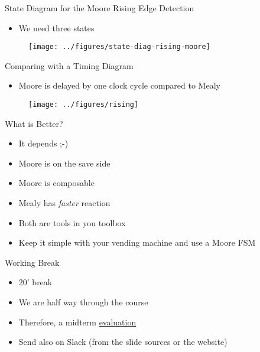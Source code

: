 \begin{frame}[fragile]{State Diagram for the Moore Rising Edge Detection}
\begin{itemize}
\item We need three states
\end{itemize}
\begin{figure}
  \texttt{[image: ../figures/state-diag-rising-moore]}
\end{figure}
\end{frame}

\begin{frame}[fragile]{Comparing with a Timing Diagram}
\begin{itemize}
\item Moore is delayed by one clock cycle compared to Mealy
\end{itemize}
\begin{figure}
  \texttt{[image: ../figures/rising]}
\end{figure}
\end{frame}

\begin{frame}[fragile]{What is Better?}
\begin{itemize}
\item It depends ;-)
\item Moore is on the save side
\item Moore is composable
\item Mealy has \emph{faster} reaction
\item Both are tools in you toolbox
\item Keep it simple with your vending machine and use a Moore FSM
\end{itemize}
\end{frame}

\begin{frame}[fragile]{Working Break}
\begin{itemize}
\item 20' break
\item We are half way through the course
\item Therefore, a midterm \href{https://docs.google.com/forms/d/e/1FAIpQLSd93nSVDE-sk75GtU3OgMB0TI7HxVB5i3KlDu0YILb39WMdIw/viewform?usp=sf_link}{evaluation}
\item Send also on Slack (from the slide sources or the website)
\end{itemize}
\end{frame}

